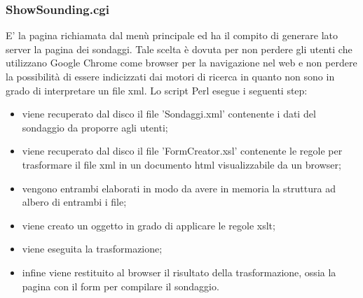\documentclass[10pt,a4paper,onecolumn]{article}
\begin{document}
\subsubsection{ShowSounding.cgi}
E' la pagina richiamata dal menù principale ed ha il compito di generare lato server la pagina dei sondaggi. Tale scelta è dovuta per non perdere gli utenti che utilizzano Google Chrome come browser per la navigazione nel web e non perdere la possibilità di essere indicizzati dai motori di ricerca in quanto non sono in grado di interpretare un file xml. Lo script Perl esegue i seguenti step:
\begin{itemize}
	\item viene recuperato dal disco il file 'Sondaggi.xml' contenente i dati del sondaggio da proporre agli utenti;
	\item viene recuperato  dal disco il file 'FormCreator.xsl' contenente le regole per trasformare il file xml in un documento html visualizzabile da un browser;
	\item vengono entrambi elaborati in modo da avere in memoria la struttura ad albero di entrambi i file;
	\item viene creato un oggetto in grado di applicare le regole xslt;
	\item viene eseguita la trasformazione;
	\item infine viene restituito al browser il risultato della trasformazione, ossia la pagina con il form per compilare il sondaggio.
\end{itemize}
\end{document}

